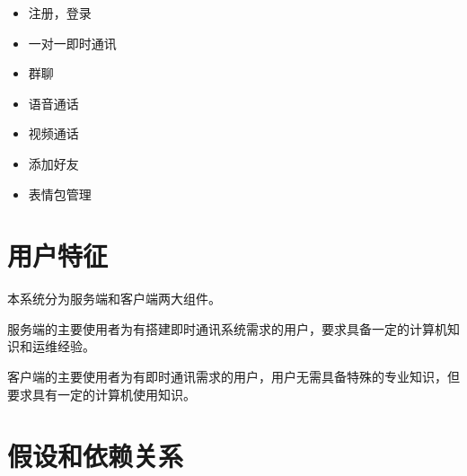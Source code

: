 


\begin{itemize}
	\item 注册，登录
	\item 一对一即时通讯
	\item 群聊
	\item 语音通话
	\item 视频通话
	\item 添加好友
	\item 表情包管理
	\end{itemize}

\section{用户特征}
%
%

本系统分为服务端和客户端两大组件。

服务端的主要使用者为有搭建即时通讯系统需求的用户，要求具备一定的计算机知识和运维经验。

客户端的主要使用者为有即时通讯需求的用户，用户无需具备特殊的专业知识，但要求具有一定的计算机使用知识。

\section{假设和依赖关系}

